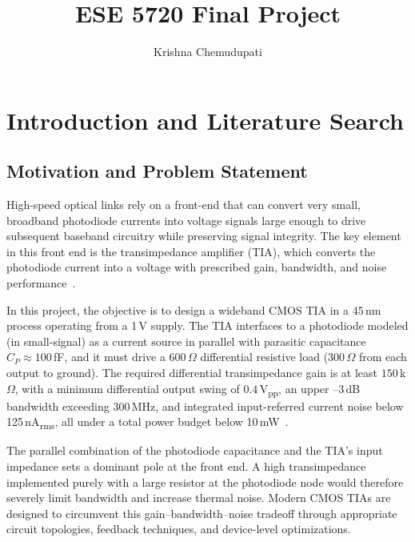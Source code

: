 \documentclass[11pt]{article}
\title{ESE 5720 Final Project}
\author{Krishna Chemudupati}
\begin{document}

\maketitle
\tableofcontents
\newpage

\section{Introduction and Literature Search}

\subsection{Motivation and Problem Statement}

High-speed optical links rely on a front-end that can convert very small, broadband photodiode currents into voltage signals large enough to drive subsequent baseband circuitry while preserving signal integrity. The key element in this front end is the transimpedance amplifier (TIA), which converts the photodiode current into a voltage with prescribed gain, bandwidth, and noise performance~\cite{course_handout}.

In this project, the objective is to design a wideband CMOS TIA in a 45\,nm process operating from a 1\,V supply. The TIA interfaces to a photodiode modeled (in small-signal) as a current source in parallel with parasitic capacitance $C_P \approx 100$\,fF, and it must drive a $600\,\Omega$ differential resistive load ($300\,\Omega$ from each output to ground). The required differential transimpedance gain is at least $150$\,k$\Omega$, with a minimum differential output swing of $0.4$\,V\textsubscript{pp}, an upper --3\,dB bandwidth exceeding 300\,MHz, and integrated input-referred current noise below 125\,nA\textsubscript{rms}, all under a total power budget below 10\,mW~\cite{course_handout}.

The parallel combination of the photodiode capacitance and the TIA’s input impedance sets a dominant pole at the front end. A high transimpedance implemented purely with a large resistor at the photodiode node would therefore severely limit bandwidth and increase thermal noise. Modern CMOS TIAs are designed to circumvent this gain--bandwidth--noise tradeoff through appropriate circuit topologies, feedback techniques, and device-level optimizations.
\end{document}
